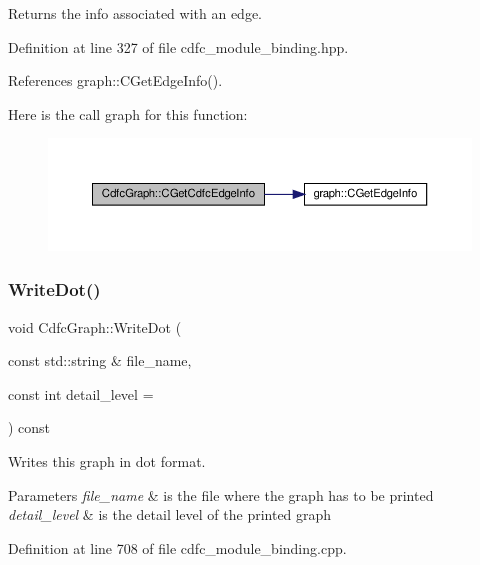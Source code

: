 Returns the info associated with an edge. 



Definition at line 327 of file cdfc\+\_\+module\+\_\+binding.\+hpp.



References graph\+::\+C\+Get\+Edge\+Info().

Here is the call graph for this function\+:
\nopagebreak
\begin{figure}[H]
\begin{center}
\leavevmode
\includegraphics[width=350pt]{d9/da3/classCdfcGraph_a0f52c6080324455730103c8a7a634d40_cgraph}
\end{center}
\end{figure}
\mbox{\label{classCdfcGraph_a018d7ee1154139dc49ea1bc823edea61}} 
\subsubsection{\texorpdfstring{Write\+Dot()}{WriteDot()}}
{\footnotesize\ttfamily void Cdfc\+Graph\+::\+Write\+Dot (\begin{DoxyParamCaption}\item[{const std\+::string \&}]{file\+\_\+name,  }\item[{const int}]{detail\+\_\+level = {} }\end{DoxyParamCaption}) const}



Writes this graph in dot format. 


\begin{DoxyParams}{Parameters}
{\em file\+\_\+name} & is the file where the graph has to be printed \\
\hline
{\em detail\+\_\+level} & is the detail level of the printed graph \\
\hline
\end{DoxyParams}


Definition at line 708 of file cdfc\+\_\+module\+\_\+binding.\+cpp.



